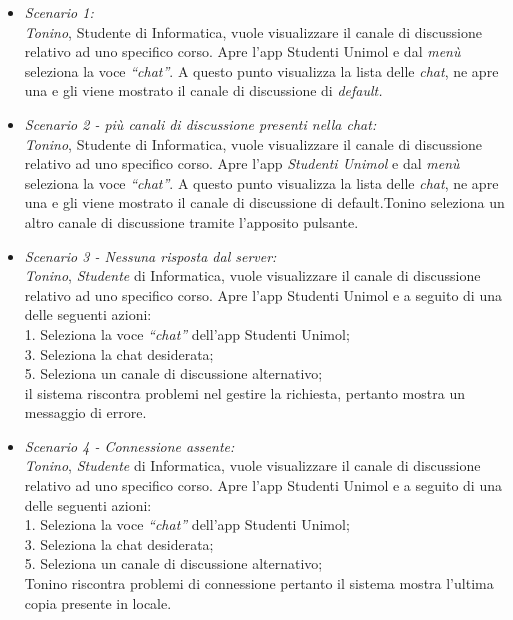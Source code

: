 \begin{itemize}
	
	\item \textit{Scenario 1:\\}
	\textit{Tonino}, Studente di Informatica, vuole visualizzare il canale di discussione relativo ad uno specifico corso. Apre l’app Studenti Unimol e dal \textit{menù} seleziona la voce \textit{“chat”}. A questo punto visualizza la lista delle \textit{chat}, ne apre una e gli viene mostrato il canale di discussione di \textit{default.\\}
	
	\item \textit{Scenario 2 - più canali di discussione presenti nella chat:\\}
	\textit{Tonino}, Studente di Informatica, vuole visualizzare il canale di discussione relativo ad uno specifico corso. Apre l’app \textit{Studenti Unimol} e dal \textit{menù} seleziona la voce \textit{“chat”}. A questo punto visualizza la lista delle \textit{chat}, ne apre una e gli viene mostrato il canale di discussione di default.Tonino seleziona un altro canale di discussione tramite l’apposito pulsante.\\
	
	\item \textit{Scenario 3 - Nessuna risposta dal server:\\}
	\textit{Tonino}, \textit{Studente} di Informatica, vuole visualizzare il canale di discussione relativo ad uno specifico corso. Apre l’app Studenti Unimol e a seguito di una delle seguenti azioni:\\
	1. Seleziona la voce \textit{“chat”} dell’app Studenti Unimol;\\
	3. Seleziona la chat desiderata;\\
	5. Seleziona un canale di discussione alternativo;\\
	il sistema riscontra problemi nel gestire la richiesta, pertanto mostra un messaggio di errore.\\
	
	\item \textit{Scenario 4 - Connessione assente:\\}
	\textit{Tonino}, \textit{Studente} di Informatica, vuole visualizzare il canale di discussione relativo ad uno specifico corso. Apre l’app Studenti Unimol e a seguito di una delle seguenti azioni:\\
	1. Seleziona la  voce \textit{“chat”} dell’app Studenti Unimol;\\
	3. Seleziona la chat desiderata;\\
	5. Seleziona un canale di discussione alternativo;\\
	Tonino riscontra problemi di connessione pertanto il sistema mostra l’ultima copia presente in locale.\\
	

\end{itemize}
